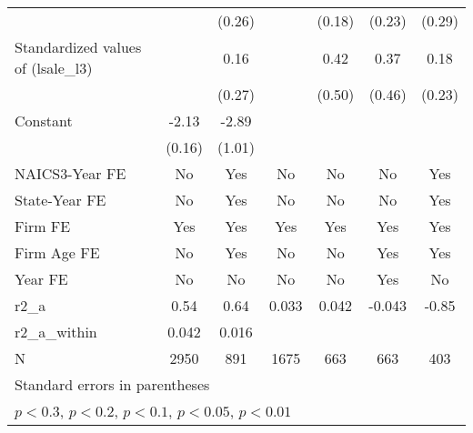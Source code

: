 {\begin{tabular}{l*{6}{c}}
                    &                     &      (0.26)         &                     &      (0.18)         &      (0.23)         &      (0.29)         \\
\addlinespace
Standardized values of (lsale\_l3)     &                     &        0.16         &                     &        0.42         &        0.37         &        0.18         \\
                    &                     &      (0.27)         &                     &      (0.50)         &      (0.46)         &      (0.23)         \\
\addlinespace
Constant            &       -2.13\sym{***}&       -2.89\sym{***}&                     &                     &                     &                     \\
                    &      (0.16)         &      (1.01)         &                     &                     &                     &                     \\
\addlinespace
NAICS3-Year FE      &          No         &         Yes         &          No         &          No         &          No         &         Yes         \\
\addlinespace
State-Year FE       &          No         &         Yes         &          No         &          No         &          No         &         Yes         \\
\addlinespace
Firm FE             &         Yes         &         Yes         &         Yes         &         Yes         &         Yes         &         Yes         \\
\addlinespace
Firm Age FE         &          No         &         Yes         &          No         &          No         &         Yes         &         Yes         \\
\addlinespace
Year FE             &          No         &          No         &          No         &          No         &         Yes         &          No         \\
\midrule
r2\_a                &        0.54         &        0.64         &       0.033         &       0.042         &      -0.043         &       -0.85         \\
r2\_a\_within         &       0.042         &       0.016         &                     &                     &                     &                     \\
N                   &        2950         &         891         &        1675         &         663         &         663         &         403         \\
\bottomrule
\multicolumn{7}{l}{\footnotesize Standard errors in parentheses}\\
\multicolumn{7}{l}{\footnotesize \sym{++} \(p<0.3\), \sym{+} \(p<0.2\), \sym{*} \(p<0.1\), \sym{**} \(p<0.05\), \sym{***} \(p<0.01\)}\\
\end{tabular}
}
